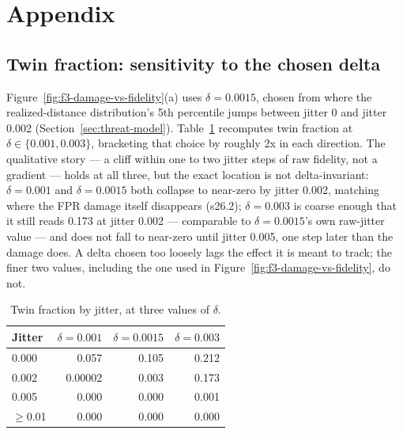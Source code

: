 \section{Appendix}
\label{sec:appendix}

\subsection{Twin fraction: sensitivity to the chosen delta}
Figure~\ref{fig:f3-damage-vs-fidelity}(a) uses $\delta=0.0015$, chosen from where the
realized-distance distribution's 5th percentile jumps between jitter 0 and jitter 0.002
(Section~\ref{sec:threat-model}). Table~\ref{tab:twin-delta-sensitivity} recomputes twin
fraction at $\delta\in\{0.001, 0.003\}$, bracketing that choice by roughly 2x in each direction.
The qualitative story — a cliff within one to two jitter steps of raw fidelity, not a gradient —
holds at all three, but the exact location is not delta-invariant: $\delta=0.001$ and
$\delta=0.0015$ both collapse to near-zero by jitter 0.002, matching where the FPR damage itself
disappears (s26.2); $\delta=0.003$ is coarse enough that it still reads 0.173 at jitter 0.002 —
comparable to $\delta=0.0015$'s own raw-jitter value — and does not fall to near-zero until
jitter 0.005, one step later than the damage does. A delta chosen too loosely lags the effect it
is meant to track; the finer two values, including the one used in Figure~\ref{fig:f3-damage-vs-fidelity},
do not.

\begin{table}[t]
  \centering
  \caption{Twin fraction by jitter, at three values of $\delta$.}
  \label{tab:twin-delta-sensitivity}
  \small
  \begin{tabular}{lrrr}
    \toprule
    Jitter & $\delta=0.001$ & $\delta=0.0015$ & $\delta=0.003$ \\
    \midrule
    0.000 & 0.057 & 0.105 & 0.212 \\
    0.002 & 0.00002 & 0.003 & 0.173 \\
    0.005 & 0.000 & 0.000 & 0.001 \\
    $\ge$0.01 & 0.000 & 0.000 & 0.000 \\
    \bottomrule
  \end{tabular}
\end{table}

